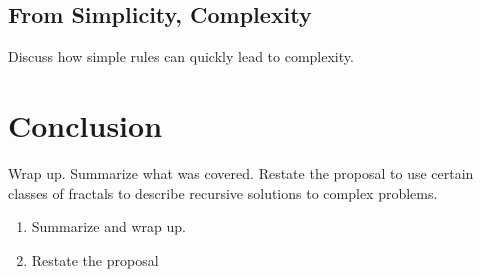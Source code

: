 \documentclass[jou,apacite]{apa6}
\begin{document}
\subsection{From Simplicity, Complexity}
Discuss how simple rules can quickly lead to complexity.

\section{Conclusion}  %
Wrap up.  Summarize what was covered.  Restate the proposal to use certain classes of fractals to describe recursive solutions to complex problems.
\begin{enumerate}
  \item Summarize and wrap up.
  \item Restate the proposal
\end{enumerate}


\end{document}
